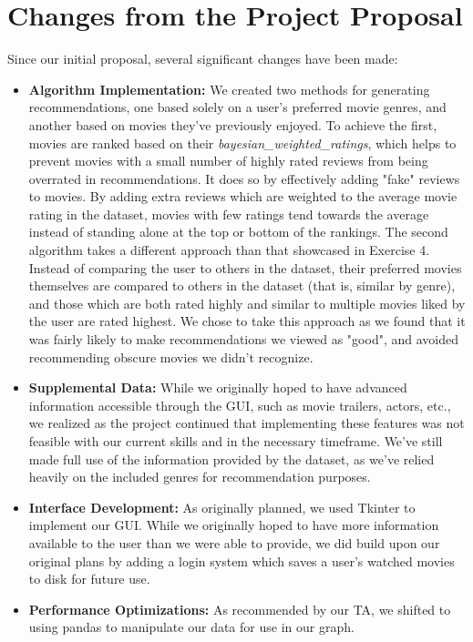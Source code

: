 \documentclass[12pt]{article}
\begin{document}
\section{Changes from the Project Proposal}
Since our initial proposal, several significant changes have been made:
\begin{itemize}
    \item \textbf{Algorithm Implementation:} We created two methods for generating recommendations, one based solely on a user's preferred movie genres, and another based on movies they've previously enjoyed. To achieve the first, movies are ranked based on their \textit{bayesian\_weighted\_ratings}, which helps to prevent movies with a small number of highly rated reviews from being overrated in recommendations. It does so by effectively adding "fake" reviews to movies. By adding extra reviews which are weighted to the average movie rating in the dataset, movies with few ratings tend towards the average instead of standing alone at the top or bottom of the rankings. The second algorithm takes a different approach than that showcased in Exercise 4. Instead of comparing the user to others in the dataset, their preferred movies themselves are compared to others in the dataset (that is, similar by genre), and those which are both rated highly and similar to multiple movies liked by the user are rated highest. We chose to take this approach as we found that it was fairly likely to make recommendations we viewed as "good", and avoided recommending obscure movies we didn't recognize.
    \item \textbf{Supplemental Data:} While we originally hoped to have advanced information accessible through the GUI, such as movie trailers, actors, etc., we realized as the project continued that implementing these features was not feasible with our current skills and in the necessary timeframe. We've still made full use of the information provided by the dataset, as we've relied heavily on the included genres for recommendation purposes.
    \item \textbf{Interface Development:} As originally planned, we used Tkinter to implement our GUI. While we originally hoped to have more information available to the user than we were able to provide, we did build upon our original plans by adding a login system which saves a user's watched movies to disk for future use.
    \item \textbf{Performance Optimizations:} As recommended by our TA, we shifted to using pandas to manipulate our data for use in our graph.
\end{itemize}
\end{document}
